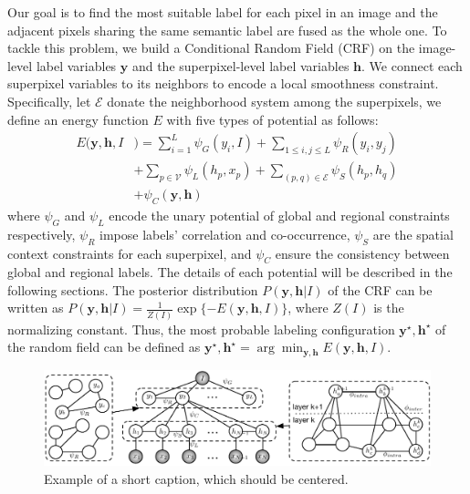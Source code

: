 Our goal is to find the most suitable label for each pixel in an image and the adjacent pixels sharing the same semantic label are fused as the whole one. To tackle this problem, we build a Conditional Random Field (CRF) on the image-level label variables $\boldsymbol{y}$ and the superpixel-level label variables $\boldsymbol{h}$. We connect each superpixel variables to its neighbors to encode a local smoothness constraint. Specifically, let $\mathcal{E}$ donate the neighborhood system among the superpixels, we define an energy function $E$ with five types of potential as follows:
\begin{equation}
    \label{eq:energyfunction}
    \begin{aligned}
        E(\boldsymbol{y},\boldsymbol{h},I&) = \sum_{i=1}^L{\psi_{G}(y_i,I)}
                            + \sum_{1 \le i,j \le L} {\psi_{R}(y_i,y_j)}\\ &+ \sum_{p \in \mathcal{V}}{\psi_{L}(h_p,x_p)}+ \sum_{(p,q) \in \mathcal{E}}{\psi_{S}(h_p,h_q)}\\ &+ \psi_{C}(\boldsymbol{y},\boldsymbol{h})
    \end{aligned}
\end{equation}
where $\psi_G$ and $\psi_{L}$ encode the unary potential of global and regional constraints respectively, $\psi_R$ impose labels' correlation and co-occurrence, $\psi_S$ are the spatial context constraints for each superpixel, and $\psi_C$ ensure the consistency between global and regional labels. The details of each potential will be described in the following sections. The posterior distribution $P(\boldsymbol{y},\boldsymbol{h}|I)$ of the CRF can be written as $P(\boldsymbol{y},\boldsymbol{h}|I) = \frac{1}{Z(I)}\exp{\{-E(\boldsymbol{y},\boldsymbol{h},I)\}}$, where $Z(I)$ is the normalizing constant. Thus, the most probable labeling configuration $\boldsymbol{y}^{\star},\boldsymbol{h}^{\star}$ of the random field can be defined as  $\boldsymbol{y}^{\star},\boldsymbol{h}^{\star} = \arg \min_{\boldsymbol{y},\boldsymbol{h}} E(\boldsymbol{y},\boldsymbol{h},I)$.

\begin{figure}[!htb]
    \begin{center}
        \includegraphics[width=0.95\linewidth]{graphmodel.pdf}
    \end{center}
    \caption{Example of a short caption, which should be centered.}
    \label{fig:graphmodel}
\end{figure}

